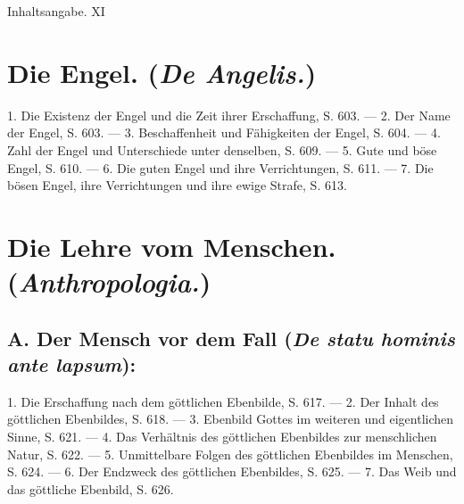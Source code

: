 \documentclass{article}
\begin{document}
\begin{center}
\large Inhaltsangabe. \hfill XI
\end{center}

\section*{Die Engel. (\emph{De Angelis.})}

1. Die Existenz der Engel und die Zeit ihrer Erschaffung, S. 603. --- 2. Der Name der Engel, S. 603. --- 3. Beschaffenheit und Fähigkeiten der Engel, S. 604. --- 4. Zahl der Engel und Unterschiede unter denselben, S. 609. --- 5. Gute und böse Engel, S. 610. --- 6. Die guten Engel und ihre Verrichtungen, S. 611. --- 7. Die bösen Engel, ihre Verrichtungen und ihre ewige Strafe, S. 613.

\section*{Die Lehre vom Menschen. (\emph{Anthropologia.})}

\subsection*{A. Der Mensch vor dem Fall (\emph{De statu hominis ante lapsum}):}
1. Die Erschaffung nach dem göttlichen Ebenbilde, S. 617. --- 2. Der Inhalt des göttlichen Ebenbildes, S. 618. --- 3. Ebenbild Gottes im weiteren und eigentlichen Sinne, S. 621. --- 4. Das Verhältnis des göttlichen Ebenbildes zur menschlichen Natur, S. 622. --- 5. Unmittelbare Folgen des göttlichen Ebenbildes im Menschen, S. 624. --- 6. Der Endzweck des göttlichen Ebenbildes, S. 625. --- 7. Das Weib und das göttliche Ebenbild, S. 626.
\end{document}
